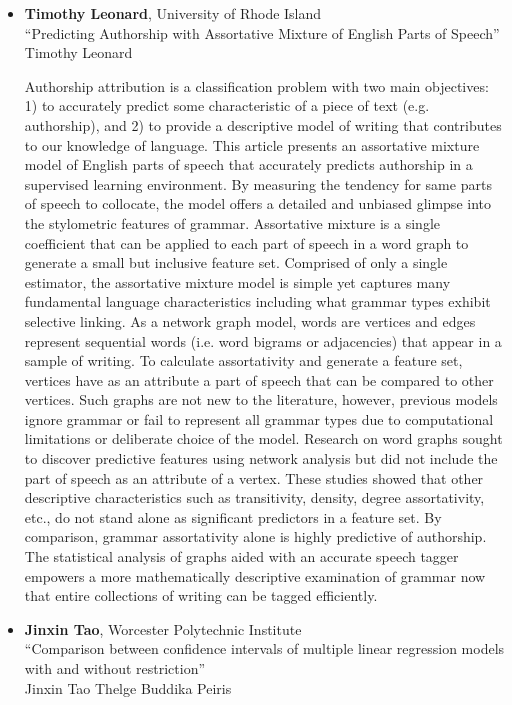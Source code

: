 \begin{itemize}
\item \textbf{Timothy Leonard}, University of Rhode Island \\
``Predicting Authorship with Assortative Mixture of English Parts of Speech'' \\
Timothy Leonard


Authorship attribution is a classification problem with two main objectives: 1) to accurately predict some characteristic of a piece of text (e.g. authorship), and 2) to provide a descriptive model of writing that contributes to our knowledge of language.  This article presents an assortative mixture model of English parts of speech that accurately predicts authorship in a supervised learning environment.  By  measuring the tendency for same parts of speech to collocate, the model offers a detailed and unbiased glimpse into the stylometric features of grammar.   Assortative mixture is a single coefficient that can be applied to each part of speech in a word graph to generate a small but inclusive feature set.  Comprised of only a single estimator, the assortative mixture model is simple yet captures many fundamental language characteristics including what grammar types exhibit selective linking.  As a network graph model, words are vertices and edges represent sequential words (i.e. word bigrams or adjacencies) that appear in a sample of writing.  To calculate assortativity and generate a feature set, vertices have as an attribute a part of speech that can be compared to other vertices.  Such graphs are not new to the literature, however, previous models ignore grammar or fail to represent all grammar types due to computational limitations or deliberate choice of the model.  Research on word graphs sought to discover predictive features using network analysis but did not include the part of speech as an attribute of a vertex.  These studies showed that other descriptive characteristics such as transitivity, density, degree assortativity, etc., do not stand alone as significant predictors in a feature set.   By comparison,  grammar assortativity alone is highly predictive of authorship.  The statistical analysis of graphs aided with an accurate speech tagger empowers a more mathematically descriptive examination of grammar now that entire collections of writing can be tagged efficiently.

\item \textbf{Jinxin Tao}, Worcester Polytechnic Institute \\
``Comparison between confidence intervals of multiple linear regression models with and without restriction'' \\
Jinxin Tao   Thelge Buddika Peiris



\end{itemize}
